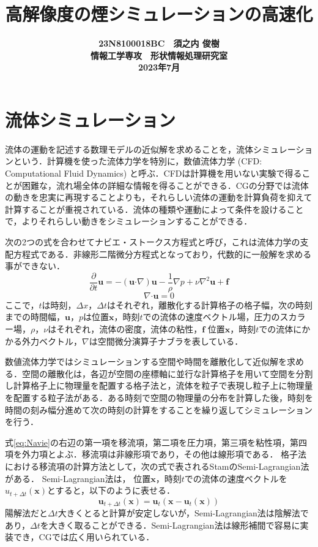 \documentclass[10pt,a4paper,notitlepage,oneside,twocolumn]{abst_jsarticle}
\title{
{\bf 高解像度の煙シミュレーションの高速化}
}
\author{\begin{center}
{\large {\bf 23N8100018BC　須之内 俊樹}}\\
{\large {\bf 情報工学専攻　形状情報処理研究室}}\\
{\large {\bf 2023年7月}}
\end{center}}
\date{}
\begin{document}
\maketitle
\section{流体シミュレーション} \label{sec:intro}
流体の運動を記述する数理モデルの近似解を求めることを，流体シミュレーションという．計算機を使った流体力学を特別に，数値流体力学 (CFD: Computational Fluid Dynamics) と呼ぶ．CFDは計算機を用いない実験で得ることが困難な，流れ場全体の詳細な情報を得ることができる．CGの分野では流体の動きを忠実に再現することよりも，それらしい流体の運動を計算負荷を抑えて計算することが重視されている．流体の種類や運動によって条件を設けることで，よりそれらしい動きをシミュレーションすることができる．

次の2つの式を合わせてナビエ・ストークス方程式と呼び，これは流体力学の支配方程式である．非線形二階微分方程式となっており，代数的に一般解を求める事ができない．
\begin{equation}\label{eq:Navie}
\frac{\partial}{\partial t}\bm{u} = - (\bm{u} \boldsymbol{\cdot}\nabla) \bm{u} - \frac{1}{\rho}\nabla p + \nu\nabla^2\bm{u} + \bm{f}
\end{equation}
$$\nabla\boldsymbol{\cdot}\bm{u} = 0$$
ここで，$t$は時刻，$\varDelta x，\varDelta t$はそれぞれ，離散化する計算格子の格子幅，次の時刻までの時間幅，$\bm{u}，p$は位置$\bm{x}$，時刻$t$での流体の速度ベクトル場，圧力のスカラー場，$\rho，\nu$はそれぞれ，流体の密度，流体の粘性，$\bm{f}$ 位置$\bm{x}$，時刻$t$での流体にかかる外力ベクトル，$\nabla$は空間微分演算子ナブラを表している．

数値流体力学ではシミュレーションする空間や時間を離散化して近似解を求める．空間の離散化は，各辺が空間の座標軸に並行な計算格子を用いて空間を分割し計算格子上に物理量を配置する格子法と，流体を粒子で表現し粒子上に物理量を配置する粒子法がある．ある時刻で空間の物理量の分布を計算した後，時刻を時間の刻み幅分進めて次の時刻の計算をすることを繰り返してシミュレーションを行う．

式\ref{eq:Navie}の右辺の第一項を移流項，第二項を圧力項，第三項を粘性項，第四項を外力項とよぶ．移流項は非線形項であり，その他は線形項である．
格子法における移流項の計算方法として，次の式で表されるStamのSemi-Lagrangian法\cite{semi-Lagrangian}がある．
Semi-Lagrangian法は， 位置$\bm{x}$，時刻$t$での流体の速度ベクトルを${u}_{t+\Delta t}(\bm{x})$とすると，以下のように表せる．
$$\bm{u}_{t+\Delta t}(\bm{x}) = \bm{u}_t(\bm{x}-\bm{u}_t(\bm{x}))$$
陽解法だと$\Delta t$大きくとると計算が安定しないが，Semi-Lagrangian法は陰解法であり，$\Delta t$を大きく取ることができる．Semi-Lagrangian法は線形補間で容易に実装でき，CGでは広く用いられている．
\end{document}
